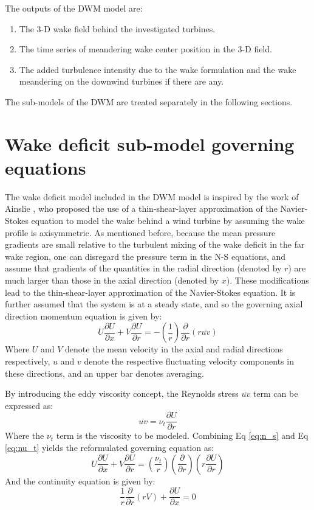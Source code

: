 \documentclass{umthesis}
\begin{document}
The outputs of the DWM model are:
\begin{enumerate}
  \item The 3-D wake field behind the investigated turbines.
  \item The time series of meandering wake center position in the 3-D field.
  \item The added turbulence intensity due to the wake formulation and the wake meandering on the downwind turbines if there are any.
\end{enumerate}

The sub-models of the DWM are treated separately in the following sections.


\section{Wake deficit sub-model governing equations}\label{sec:wake_eqn}
The wake deficit model included in the DWM model is inspired by the work of Ainslie \cite{Ainslie_flow}, who proposed the use of a thin-shear-layer approximation of the Navier-Stokes equation to model the wake behind a wind turbine by assuming the wake profile is axisymmetric. As mentioned before, because the mean pressure gradients are small relative to the turbulent mixing of the wake deficit in the far wake region, one can disregard the pressure term in the N-S equations, and assume that gradients of the quantities in the radial direction (denoted by $r$) are much larger than those in the axial direction (denoted by $x$). These modifications lead to the thin-shear-layer approximation of the Navier-Stokes equation. It is further assumed that the system is at a steady state, and so the governing axial direction momentum equation is given by:
\begin{equation}\label{eq:n_s}
  U\frac{\partial U}{\partial x}+V\frac{\partial U}{\partial r}=-(\frac{1}{r})\frac{\partial}{\partial r}(r\overline{uv})
\end{equation}
Where $U$ and $V$ denote the mean velocity in the axial and radial directions respectively, $u$ and $v$ denote the respective fluctuating velocity components in these directions, and an upper bar denotes averaging.

By introducing the eddy viscosity concept, the Reynolds stress $\overline{uv}$ term can be expressed as:
\begin{equation}\label{eq:nu_t}
  \overline{uv}=\nu_t\frac{\partial U}{\partial r}
\end{equation}
Where the $\nu_t$ term is the viscosity to be modeled. Combining Eq \ref{eq:n_s} and Eq \ref{eq:nu_t} yields the reformulated governing equation as:
\begin{equation}\label{eq:x_momentum_1}
  U\frac{\partial U}{\partial x}+V\frac{\partial U}{\partial r}=(\frac{\nu_t}{r})(\frac{\partial}{\partial r})(r\frac{\partial U}{\partial r})
\end{equation}
And the continuity equation is given by:
\begin{equation}\label{eq:continuity_1}
  \frac{1}{r}\frac{\partial}{\partial r}(rV)+\frac{\partial U}{\partial x}=0
\end{equation}
\end{document}
